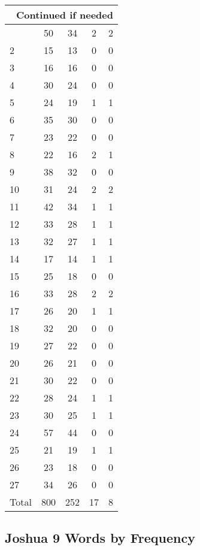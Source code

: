\begin{center}
\begin{longtable}{l|c|c|c|c}
\hline \multicolumn{5}{|r|}{{Continued if needed}} \\ \hline
\endfoot 
1 & 50 & 34 & 2 & 2\\ \hline
2 & 15 & 13 & 0 & 0\\ \hline
3 & 16 & 16 & 0 & 0\\ \hline
4 & 30 & 24 & 0 & 0\\ \hline
5 & 24 & 19 & 1 & 1\\ \hline
6 & 35 & 30 & 0 & 0\\ \hline
7 & 23 & 22 & 0 & 0\\ \hline
8 & 22 & 16 & 2 & 1\\ \hline
9 & 38 & 32 & 0 & 0\\ \hline
10 & 31 & 24 & 2 & 2\\ \hline
11 & 42 & 34 & 1 & 1\\ \hline
12 & 33 & 28 & 1 & 1\\ \hline
13 & 32 & 27 & 1 & 1\\ \hline
14 & 17 & 14 & 1 & 1\\ \hline
15 & 25 & 18 & 0 & 0\\ \hline
16 & 33 & 28 & 2 & 2\\ \hline
17 & 26 & 20 & 1 & 1\\ \hline
18 & 32 & 20 & 0 & 0\\ \hline
19 & 27 & 22 & 0 & 0\\ \hline
20 & 26 & 21 & 0 & 0\\ \hline
21 & 30 & 22 & 0 & 0\\ \hline
22 & 28 & 24 & 1 & 1\\ \hline
23 & 30 & 25 & 1 & 1\\ \hline
24 & 57 & 44 & 0 & 0\\ \hline
25 & 21 & 19 & 1 & 1\\ \hline
26 & 23 & 18 & 0 & 0\\ \hline
27 & 34 & 26 & 0 & 0\\ \hline
Total & 800 & 252 & 17 & 8
\end{longtable}
\end{center}





\subsection{Joshua 9 Words by Frequency}


\normalsize
 
